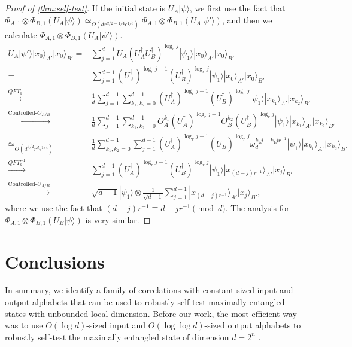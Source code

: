 \documentclass[11pt,letterpaper]{article}
\newcommand{\ket}[1]{|#1\rangle}
\newcommand{\x}{\otimes}
\newcommand{\ct}{^{\dagger}}
\newcommand{\1}{\mathbb{1}}
\newcommand{\ep}{\epsilon}
\newcommand{\qe}{\epsilon^{1/4}}
\newcommand{\appd}[1]{\simeq_{#1}}
\theoremstyle{definition}
\begin{document}
\begin{proof}[Proof of \cref{thm:self-test}]
If the initial state is $U_A\ket{\psi}$, we first use the fact that 
$ \Phi_{A,1} \x \Phi_{B,1} (U_A\ket{\psi}) \appd{O(d r^{d/2+1/4} \ep^{1/8})}  \Phi_{A,1} \x \Phi_{B,1} (U_A\ket{\psi'})$, 
and then we calculate $\Phi_{A,1} \x \Phi_{B,1} (U_A\ket{\psi'})$.
\begin{align*}
	U_A \ket{\psi'} \ket{x_0}_{A'}\ket{x_0}_{B'} =&  
		\sum_{j=1}^{d-1} U_A(U_A\ct U_B\ct)^{\log_r j}\ket{\psi_1} \ket{x_0}_{A'}\ket{x_0}_{B'}\\
		=&\sum_{j=1}^{d-1}(U_A\ct)^{\log_r j-1}  (U_B\ct)^{\log_r j} \ket{\psi_1} \ket{x_0}_{A'}\ket{x_0}_{B'}\\
		\xrightarrow[]{QFT_d} &\frac{1}{d}\sum_{j=1}^{d-1} \sum_{k_1,k_2 = 0}^{d-1}(U_A\ct)^{\log_r j-1} (U_B\ct)^{\log_r j} \ket{\psi_1}  \ket{x_{k_1}}_{A'}\ket{x_{k_2}}_{B'}\\
		\xrightarrow[]{\text{Controlled-}O_{A/B}}&\frac{1}{d}\sum_{j=1}^{d-1}\sum_{k_1,k_2 = 0}^{d-1} 
		 O_A^{k_1}(U_A\ct)^{\log_r j-1} O_B^{k_2}(U_B\ct)^{\log_r j} \ket{\psi_1} 
		 \ket{x_{k_1}}_{A'}\ket{x_{k_2}}_{B'}\\
		\appd{O(d^{5/2} r^{d} \qe)}& \frac{1}{d}\sum_{k_1,k_2 = 0}^{d-1} \sum_{j=1}^{d-1} (U_A\ct)^{\log_r j-1} (U_B\ct)^{\log_r j}
		\omega_d^{k_2j-k_1jr^{-1}}\ket{\psi_1}
		 \ket{x_{k_1}}_{A'}\ket{x_{k_2}}_{B'}\\
		\xrightarrow[]{QFT_d^{-1}}& \sum_{j=1}^{d-1}  (U_A\ct)^{\log_r j-1} (U_B\ct)^{\log_r j}  
		\ket{\psi_1} \ket{x_{(d-j)r^{-1}}}_{A'}\ket{x_j}_{B'}\\
		\xrightarrow[]{\text{Controlled-}U_{A/B}}& \sqrt{d-1} \ket{\psi_1} \x  
		\frac{1}{\sqrt{d-1}} \sum_{j=1}^{d-1} \ket{x_{(d-j)r^{-1}}}_{A'}\ket{x_j}_{B'},
\end{align*}
where we use the fact that $(d-j)r^{-1} \equiv d -jr^{-1} \pmod{d}$.
The analysis for $\Phi_{A,1} \x\Phi_{B,1} (U_B \ket{\psi})$ is very similar.
\end{proof}

\section{Conclusions}
\label{sec:conclu}
In summary, we identify a family of correlations with constant-sized input and output alphabets that can be used to robustly self-test
maximally entangled states with unbounded local dimension.
Before our work, the most efficient way 
was to use $O(\log d)$-sized input and $O(\log \log d)$-sized output alphabets to robustly self-test
the maximally entangled state of dimension $d = 2^n$ \cite{lowdegree}.
\end{document}
